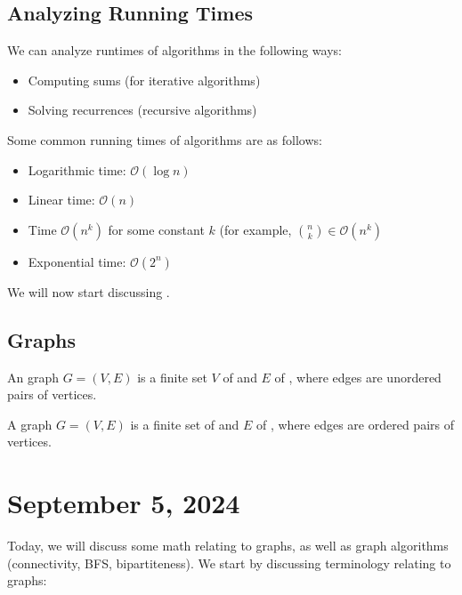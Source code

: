 \documentclass[12pt]{scrartcl}
\begin{document}
\subsection{Analyzing Running Times}
We can analyze runtimes of algorithms in the following ways:
    \begin{itemize}
        \item Computing sums (for iterative algorithms)
        \item Solving recurrences (recursive algorithms)
    \end{itemize}

Some common running times of algorithms are as follows:
    \begin{itemize}
        \item Logarithmic time: $\mathcal{O}(\log n)$
        \item Linear time: $\mathcal{O}(n)$
        \item Time $\mathcal{O}(n^k)$ for some constant $k$ (for example, $\binom{n}{k} \in \mathcal{O}(n^k)$
        \item Exponential time: $\mathcal{O}(2^n)$
    \end{itemize}

We will now start discussing .

\subsection{Graphs}
\begin{definition}
    An  graph $G = (V, E)$ is a finite set $V$ of  and $E$ of , where edges are unordered pairs of vertices.
\end{definition}

\begin{definition}
    A  graph $G = (V, E)$ is a finite set of  and $E$ of , where edges are ordered pairs of vertices.
\end{definition}

\section{September 5, 2024}

Today, we will discuss some math relating to graphs, as well as graph algorithms (connectivity, BFS, bipartiteness). We start by discussing terminology relating to graphs:
\end{document}
